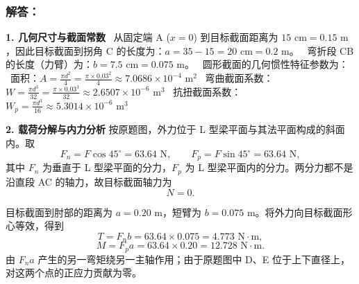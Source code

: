 \documentclass[11pt,a4paper]{ctexrep}
\begin{document}
{\begin{center}
\end{center}

\subsubsection*{解答：}

\textbf{1. 几何尺寸与截面常数}
\noindent\textbullet\ 从固定端 A ($x = 0$) 到目标截面距离为 $15\text{ cm} = 0.15\text{ m}$，因此目标截面到拐角 C 的长度为：$a = 35 - 15 = 20\text{ cm} = 0.2\text{ m}$。
\noindent\textbullet\ 弯折段 CB 的长度（力臂）为：$b = 7.5\text{ cm} = 0.075\text{ m}$。
\noindent\textbullet\ 圆形截面的几何惯性特征参数为：
\noindent\textbullet\ 面积：$A = \frac{\pi d^2}{4} = \frac{\pi \times 0.03^2}{4} \approx 7.0686 \times 10^{-4}\text{ m}^2$
\noindent\textbullet\ 弯曲截面系数：$W = \frac{\pi d^3}{32} = \frac{\pi \times 0.03^3}{32} \approx 2.6507 \times 10^{-6}\text{ m}^3$
\noindent\textbullet\ 抗扭截面系数：$W_p = \frac{\pi d^3}{16} \approx 5.3014 \times 10^{-6}\text{ m}^3$

\textbf{2. 载荷分解与内力分析}
按原题图，外力位于 L 型梁平面与其法平面构成的斜面内。取
\[
    F_n=F\cos45^\circ=63.64\text{ N},\qquad
    F_p=F\sin45^\circ=63.64\text{ N},
\]
其中 $F_n$ 为垂直于 L 型梁平面的分力，$F_p$ 为 L 型梁平面内的分力。两分力都不是沿直段 AC 的轴力，故目标截面轴力为
\[
    N=0.
\]

目标截面到肘部的距离为 $a=0.20\text{ m}$，短臂为 $b=0.075\text{ m}$。将外力向目标截面形心等效，得到
\[
    T=F_n b=63.64\times0.075=4.773\text{ N}\cdot\text{m},
\]
\[
    M=F_p a=63.64\times0.20=12.728\text{ N}\cdot\text{m}.
\]
由 $F_n a$ 产生的另一弯矩绕另一主轴作用；由于原题图中 D、E 位于上下直径上，对这两个点的正应力贡献为零。

}
\end{document}
